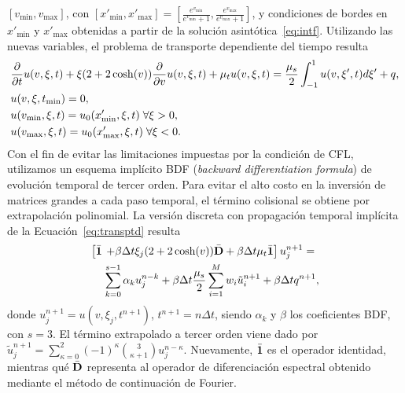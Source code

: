 $[v_{\text{min}},v_{\text{max}}]$, con 
$[x'_{\text{min}},x'_{\text{max}}]=[\frac{e^{v_{\text{min}}}}{e^{v_{\text{min}}}+1},
\frac{e^{v_{\text{max}}}}{e^{v_{\text{max}}}+1}]$, 
y condiciones de bordes en $x'_{\text{min}}$ y $x'_{\text{max}}$ 
obtenidas a partir de la solución asintótica~\eqref{eq:intf}. Utilizando las nuevas variables, 
el problema de transporte dependiente del tiempo resulta 
\begin{equation}
\begin{split}
&\frac{\partial}{\partial t}u(v,\xi,t)+\xi(2+2\cosh(v)) \frac{\partial}{\partial v}u(v,\xi,t)+
\mu_tu(v,\xi,t)=\frac{\mu_s}{2} \int_{-1}^{1} u(v,\xi',t) d\xi'+q, \\
&u(v,\xi,t_{\text{min}})=0,\\
&u(v_{\text{min}},\xi,t)=u_{0}(x'_{\text{min}},\xi,t) \; \forall \xi>0,\\
&u(v_{\text{max}},\xi,t)=u_{0}(x'_{\text{max}},\xi,t) \; \forall \xi<0.
\end{split}
\label{eq:transptd}
\end{equation}
Con el fin de evitar las
limitaciones impuestas por la condición de CFL, utilizamos un 
esquema implícito BDF ({\em backward differentiation formula}) de evolución temporal de tercer orden. 
Para evitar el alto costo en la inversión de matrices grandes a 
cada paso temporal, el término 
colisional se obtiene por extrapolación polinomial. La versión discreta con propagación temporal 
implícita de la Ecuación~\eqref{eq:transptd} resulta
\begin{equation*}
\begin{aligned}
 \left[ \bar{\mathbf{1}} \right. & \left.+ \beta\Delta t\xi_j (2+2\cosh(v)) \bar{\mathbf{D}} + \beta\Delta t \mu_t \bar{\mathbf{1}} \right]  
 u^{n+1}_j  = \\
&\sum_{k=0}^{s-1}\alpha_k u_j^{n-k} + \beta\Delta t \frac{\mu_s}{2}
 \sum_{i=1}^{M} w_i \tilde{u}_i^{n+1} + \beta\Delta t q^{n+1},
\end{aligned}
\label{eq:transptd1disc}
\end{equation*}
donde $u^{n+1}_j=u(v,\xi_j,t^{n+1})$, $t^{n+1}=n\Delta t$, siendo $\alpha_k$ y $\beta$ 
los coeficientes BDF, con $s=3$. El término extrapolado 
a tercer orden viene dado por $\tilde{u}_j^{n+1}=\sum_{\kappa=0}^{2}(-1)^\kappa {3 \choose \kappa+1} u_j^{n-\kappa}$. Nuevamente, 
$\bar{\mathbf{1}}$ es el operador identidad, mientras qué $\bar{\mathbf{D}}$ representa al operador 
de diferenciación espectral obtenido mediante el método de continuación de Fourier. 

